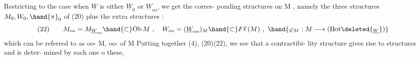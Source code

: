 Restricting to the case when $\underline{W}$ is either $\underline{W}_{0}$ or $\underline{W}_{\mathrm{oo}}$, we get the corres-%
ponding structures on M , namely the three structures $M_0, W_0, \hand{\pi}_0$ of (20)
plus the  extra structures :
\[
(22) \qquad M_\mathrm{oo} = M_{\underline{W}_\mathrm{oo}} \hand{\subset} \mathrm{Ob}\,M \ , \quad W_\mathrm{oo} = (\underline{W}_\mathrm{oo})_M \hand{\subset} F\ell\,(M) \ , \ \hand{\varphi_M : M \longrightarrow (\mathrm{Hot}\deleted{_{\underline{W}}})}
\]
which can be referred to as $\mathrm{oo}$-\hand{\uline{\textcolor{black}{connected}}} \hand{\uline{\textcolor{black}{objects}}} \hand{\uline{\textcolor{black}{of}}} M,  $\mathrm{oo}$-\hand{\uline{\textcolor{black}{connected}}}
\margin{$\times$} \hand{\uline{\textcolor{black}{arrows}}} of M  Putting together (4), (20)\hand{,}(22), we see that a contractibi-%
lity structure  gives rise to   structures  and is deter-%
mined by each one o these, 



